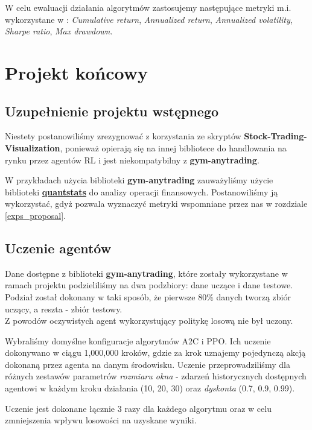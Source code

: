 \documentclass[12pt,a4paper]{article}
\begin{document}
W celu ewaluacji działania algorytmów zastosujemy następujące metryki
m.i. wykorzystane w \cite{ensemble_strat}: \emph{Cumulative return},
\emph{Annualized return}, \emph{Annualized volatility}, \emph{Sharpe ratio},
\emph{Max drawdown}.

\pagebreak
\section{Projekt końcowy}

\subsection{Uzupełnienie projektu wstępnego}

Niestety postanowiliśmy zrezygnować z korzystania ze skryptów \textbf{Stock-Trading-Visualization},
ponieważ opierają się na innej bibliotece do handlowania na rynku przez
agentów RL i jest niekompatybilny z \textbf{gym-anytrading}.

W przykładach użycia biblioteki \textbf{gym-anytrading} zauważyliśmy
użycie biblioteki
\textbf{\href{https://github.com/ranaroussi/quantstats}{quantstats}}
do analizy operacji finansowych. Postanowiliśmy ją wykorzystać, gdyż
pozwala wyznaczyć metryki wspomniane przez nas w rozdziale
\ref{exps_proposal}.

\subsection{Uczenie agentów}

Dane dostępne z biblioteki \textbf{gym-anytrading}, które zostały wykorzystane
w ramach projektu podzieliliśmy na dwa podzbiory: dane uczące i dane testowe.
Podział został dokonany w taki sposób, że pierwsze $80\%$ danych tworzą
zbiór uczący, a reszta - zbiór testowy. \\

Z powodów oczywistych agent wykorzystujący politykę losową nie był uczony.
\smallskip

Wybraliśmy domyślne konfiguracje algorytmów A2C i PPO.
Ich uczenie dokonywano w ciągu 1,000,000 kroków,
gdzie za krok uznajemy pojedynczą akcją dokonaną przez
agenta na danym środowisku. Uczenie przeprowadziliśmy dla różnych zestawów
parametrów \emph{rozmiaru okna} - zdarzeń historycznych dostępnych agentowi
w każdym kroku działania (10, 20, 30) oraz \emph{dyskonta} (0.7, 0.9, 0.99).

Uczenie jest dokonane łącznie 3 razy
dla każdego algorytmu oraz w celu zmniejszenia wpływu
losowości na uzyskane wyniki.
\end{document}

